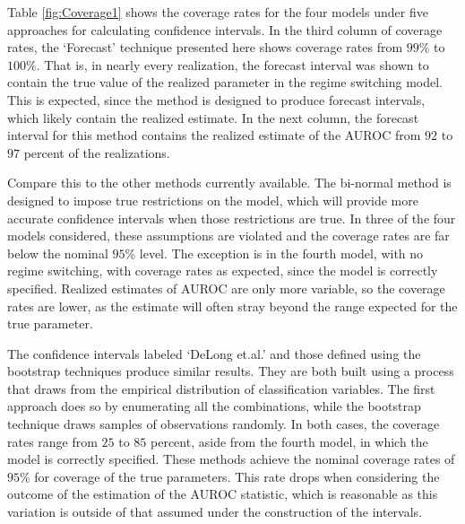 




%
%
%
%

Table \ref{fig:Coverage1} shows the coverage rates for the four models under five approaches for calculating confidence intervals.
In the third column of coverage rates, the `Forecast' technique presented here shows coverage rates from $99\%$ to $100\%$.
That is, in nearly every realization, the forecast interval was shown to contain the true value of the realized parameter in the regime switching model.
This is expected, since the method is designed to produce forecast intervals, which likely contain the realized estimate.
In the next column, the forecast interval for this method contains the realized estimate of the AUROC from $92$ to $97$ percent of the realizations.

Compare this to the other methods currently available.
The bi-normal method is designed to impose true restrictions on the model, which will provide more accurate confidence intervals when those restrictions are true.
In three of the four models considered, these assumptions are violated and the coverage rates are far below the nominal $95\%$ level.
The exception is in the fourth model, with no regime switching, with coverage rates as expected, since the model is correctly specified.
Realized estimates of AUROC are only more variable, so the coverage rates are lower, as the estimate will often stray beyond the range expected for the true parameter.

The confidence intervals labeled `DeLong et.al.' and those defined using the bootstrap techniques produce similar results.
They are both built using a process that draws from the empirical distribution of classification variables.
The first approach does so by enumerating all the combinations, while the bootstrap technique draws samples of observations randomly.
In both cases, the coverage rates range from $25$ to $85$ percent, aside from the fourth model, in which the model is correctly specified.
These methods achieve the nominal coverage rates of $95\%$ for coverage of the true parameters.
This rate drops when considering the outcome of the estimation of the AUROC statistic, which is reasonable as this variation is outside of that assumed under the construction of the intervals.






% 



